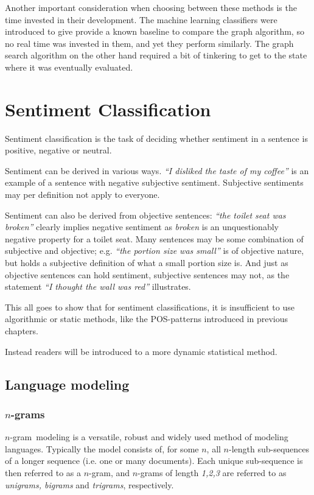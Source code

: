 \documentclass[a4paper,11pt]{kth-mag}
\newcommand{\ngram}{$n$-gram}
\begin{document}
Another important consideration when choosing between these methods is the time invested in their development.
The machine learning classifiers were introduced to give provide a known baseline to compare the graph algorithm,
so no real time was invested in them, and yet they perform similarly. The graph search algorithm on the other hand
required a bit of tinkering to get to the state where it was eventually evaluated.


\chapter{Sentiment Classification}
\label{sec:sentiment_classification}
Sentiment classification is the task of deciding whether sentiment in a sentence
is positive, negative or neutral\cite{nlp_book}.

Sentiment can be derived in various ways. \emph{``I disliked the taste of my coffee''}
is an example of a sentence with negative subjective sentiment.
Subjective sentiments may per definition not apply to everyone.

Sentiment can also be derived from objective sentences:
\emph{``the toilet seat was broken''} clearly implies negative sentiment
as \emph{broken} is an unquestionably negative property for a toilet seat.
Many sentences may be some combination of subjective and objective;
e.g. \emph{``the portion size was small''} is of objective nature,
but holds a subjective definition of what a small portion size is.
And just as objective sentences can hold sentiment, subjective sentences may not, as
the statement \emph{``I thought the wall was red''} illustrates.

This all goes to show that for sentiment classifications, it is insufficient
to use algorithmic or static methods, like the POS-patterns introduced in previous
chapters.

Instead readers will be introduced to a more dynamic statistical method.

\section{Language modeling}

\subsection{\ngram s}
\label{subsec:ngrams}
\ngram~modeling is a versatile, robust and widely used method of modeling languages. Typically the model consists of, for some $n$, all $n$-length sub-sequences of a longer sequence (i.e. one or many documents). Each unique sub-sequence is then referred to as a \ngram, and \ngram s of length \emph{1,2,3} are referred to as \emph{unigrams, bigrams} and \emph{trigrams}, respectively\cite{ngrams}.
\end{document}
